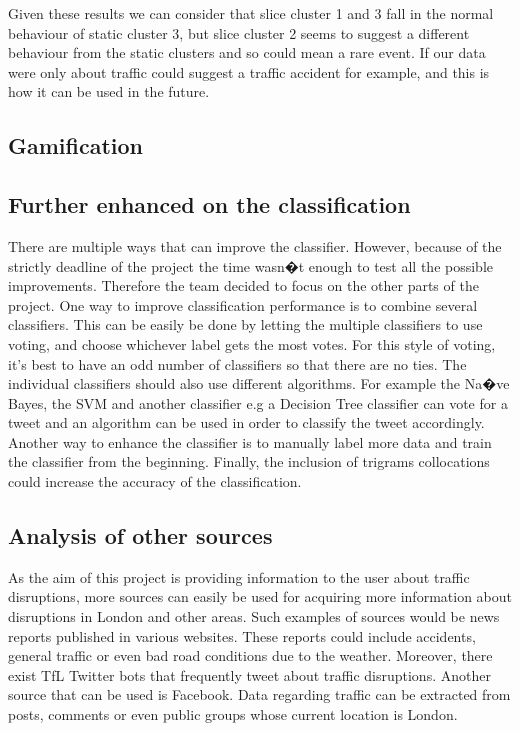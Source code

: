 Given these results we can consider that slice cluster 1 and 3 fall in the
normal behaviour of static cluster 3, but slice cluster 2 seems to suggest a
different behaviour from the static clusters and so could mean a rare event.
If our data were only about traffic could suggest a traffic accident for
example, and this is how it can be used in the future.

\subsection{Gamification}

\subsection{Further enhanced on the classification}
There are multiple ways that can improve the classifier. However, because of the strictly deadline of the project the time wasn�t enough to test all the possible improvements. Therefore the team decided to focus on the other parts of the project. One way to improve classification performance is to combine several classifiers. This can be easily be done by letting the multiple classifiers to use voting, and choose whichever label gets the most votes. For this style of voting, it's best to have an odd number of classifiers so that there are no ties. The individual classifiers should also use different algorithms. For example the Na�ve Bayes, the SVM and another classifier e.g a Decision Tree classifier can vote for a tweet and an algorithm can be used in order to classify the tweet accordingly.  Another way to enhance the classifier is to manually label more data and train the classifier from the beginning. Finally, the inclusion of trigrams collocations could increase the accuracy of the classification.  

\subsection{Analysis of other sources}
As the aim of this project is providing information to the user about traffic disruptions, more sources can 
easily be used for acquiring more information about disruptions in London and other areas. Such examples 
of sources would be news reports published in various websites. These reports could include accidents, general traffic or even 
bad road conditions due to the weather. Moreover, there exist TfL Twitter bots that frequently tweet
about traffic disruptions. Another source that can be used is Facebook. Data regarding traffic can be
extracted from posts, comments or even public groups whose current location is London.

